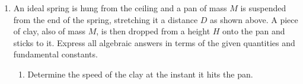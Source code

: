 {\begin{enumerate}[leftmargin=12pt]
%    
%        
%        
%    
%
  \item An ideal spring is hung from the ceiling and a pan of mass $M$ is
    suspended from the end of the spring, stretching it a distance $D$ as shown
    above. A piece of clay, also of mass $M$, is then dropped from a height $H$
    onto the pan and sticks to it. Express all algebraic answers in terms of the
    given quantities and fundamental constants.
    \begin{enumerate}
    \item Determine the speed of the clay at the instant it hits the pan.
      

\end{enumerate}
\end{enumerate}}
